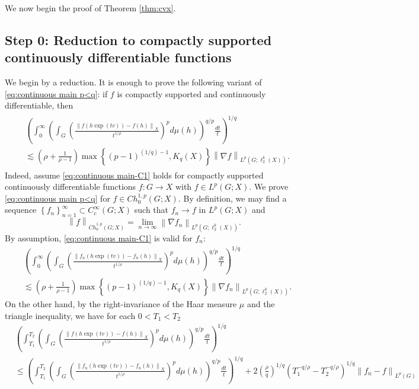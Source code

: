 \documentclass[11pt,reqno]{amsart}
\newcommand{\1}{\mathbf 1}
\begin{document}
We now begin the proof of Theorem \ref{thm:cvx}.

\subsection{Step 0: Reduction to compactly supported continuously differentiable functions}\label{subsec:step0}
We begin by a reduction. It is enough to prove the following variant of \eqref{eq:continuous main p<q}: if $f$ is compactly supported and continuously differentiable, then
\begin{align}\label{eq:continuous main-C1}
\begin{aligned}
&\left(\int_0^\infty \left(\int_{G}\left(\frac{\left\|f\left(h\exp\left(tv\right)\right)-f\left(h\right)\right\|_X}{t^{1/\rho}}\right)^pd\mu\left(h\right)\right)^{q/p}\frac{dt}{t}\right)^{1/q}\\
&\lesssim \left(\rho+\frac{1}{\rho-1}\right)\max\left\{\left(p-1\right)^{(1/q)-1},K_q\left(X\right)\right\} \left\|\nabla f\right\|_{L^p\left(G;\ell_2^k\left(X\right)\right)}.
\end{aligned}
\end{align}
Indeed, assume \eqref{eq:continuous main-C1} holds for compactly supported continuously differentiable functions $f:G\to X$ with $f\in L^p\left(G;X\right)$. We prove \eqref{eq:continuous main p<q} for $f\in Ch_0^{1,p}\left(G;X\right)$. By definition, we may find a sequence $\left\{f_n\right\}_{n=1}^\infty\subset C_c^\infty\left(G;X\right)$ such that $f_n\to f$ in $L^p\left(G;X\right)$ and
\[
\left\|f\right\|_{\dot{Ch}^{1,p}_0\left(G;X\right)}=\lim_{n\to \infty}\left\|\nabla f_n\right\|_{L^p\left(G;\ell_2^k\left(X\right)\right)}.
\]
By assumption, \eqref{eq:continuous main-C1} is valid for $f_n$:
\begin{align*}
&\left(\int_0^\infty \left(\int_{G}\left(\frac{\left\|f_n\left(h\exp\left(tv\right)\right)-f_n\left(h\right)\right\|_X}{t^{1/\rho}}\right)^pd\mu\left(h\right)\right)^{q/p}\frac{dt}{t}\right)^{1/q}\\
&\lesssim \left(\rho+\frac{1}{\rho-1}\right)\max\left\{\left(p-1\right)^{(1/q)-1},K_q\left(X\right)\right\} \left\|\nabla f_n\right\|_{L^p\left(G;\ell_2^k\left(X\right)\right)}.
\end{align*}
On the other hand, by the right-invariance of the Haar measure $\mu$ and the triangle inequality, we have for each $0<T_1<T_2$
\begin{align*}
&\left(\int_{T_1}^{T_2} \left(\int_{G}\left(\frac{\left\|f\left(h\exp\left(tv\right)\right)-f\left(h\right)\right\|_X}{t^{1/\rho}}\right)^pd\mu\left(h\right)\right)^{q/p}\frac{dt}{t}\right)^{1/q}\\
&\le \left(\int_{T_1}^{T_2} \left(\int_{G}\left(\frac{\left\|f_n\left(h\exp\left(tv\right)\right)-f_n\left(h\right)\right\|_X}{t^{1/\rho}}\right)^pd\mu\left(h\right)\right)^{q/p}\frac{dt}{t}\right)^{1/q}+2\left(\frac \rho q\right)^{1/q}\left(T_1^{-q/\rho}-T_2^{-q/\rho}\right)^{1/q}\left\|f_n-f\right\|_{L^p\left(G\right)}
\end{align*}
\end{document}

